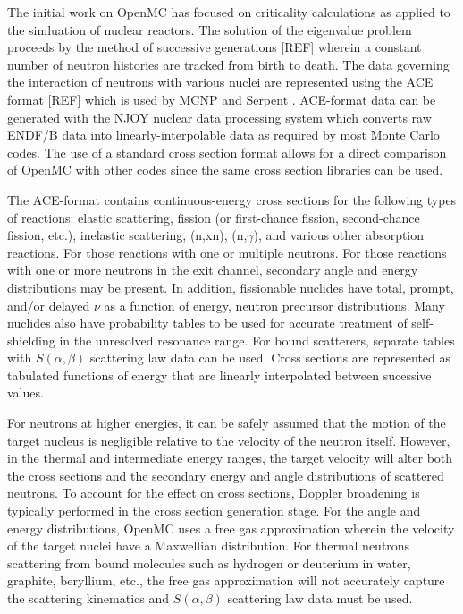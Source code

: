 \documentclass{elsarticle}
\begin{document}
The initial work on OpenMC has focused on criticality calculations as applied to
the simluation of nuclear reactors. The solution of the eigenvalue problem
proceeds by the method of successive generations [REF] wherein a constant number
of neutron histories are tracked from birth to death. The data governing the
interaction of neutrons with various nuclei are represented using the ACE format
[REF] which is used by MCNP \cite{mcnp} and Serpent \cite{serpent}. ACE-format
data can be generated with the NJOY nuclear data processing system which
converts raw ENDF/B data into linearly-interpolable data as required by most
Monte Carlo codes. The use of a standard cross section format allows for a
direct comparison of OpenMC with other codes since the same cross section
libraries can be used.

The ACE-format contains continuous-energy cross sections for the following types
of reactions: elastic scattering, fission (or first-chance fission,
second-chance fission, etc.), inelastic scattering, (n,xn), (n,$\gamma$), and
various other absorption reactions. For those reactions with one or multiple
neutrons. For those reactions with one or more neutrons in the exit channel,
secondary angle and energy distributions may be present. In addition,
fissionable nuclides have total, prompt, and/or delayed $\nu$ as a function of
energy, neutron precursor distributions. Many nuclides also have probability
tables to be used for accurate treatment of self-shielding in the unresolved
resonance range. For bound scatterers, separate tables with $S(\alpha,\beta)$
scattering law data can be used. Cross sections are represented as tabulated
functions of energy that are linearly interpolated between sucessive values.

For neutrons at higher energies, it can be safely assumed that the motion of the
target nucleus is negligible relative to the velocity of the neutron
itself. However, in the thermal and intermediate energy ranges, the target
velocity will alter both the cross sections and the secondary energy and angle
distributions of scattered neutrons. To account for the effect on cross
sections, Doppler broadening is typically performed in the cross section
generation stage. For the angle and energy distributions, OpenMC uses a free gas
approximation \cite{freegas} wherein the velocity of the target nuclei have a
Maxwellian distribution. For thermal neutrons scattering from bound molecules
such as hydrogen or deuterium in water, graphite, beryllium, etc., the free gas
approximation will not accurately capture the scattering kinematics and
$S(\alpha,\beta)$ scattering law data must be used.
\end{document}

